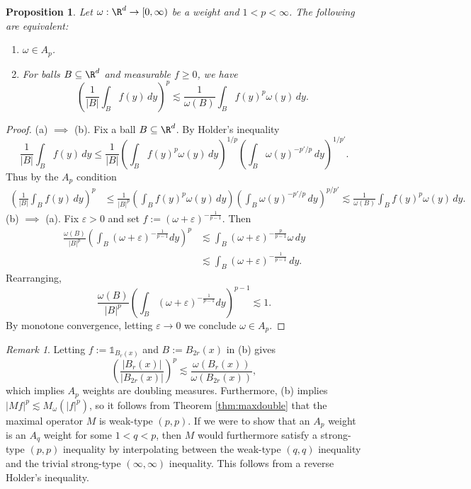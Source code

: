 \documentclass[reqno]{amsart}
\newtheorem{proposition}[theorem]{Proposition}
\theoremstyle{definition}
\theoremstyle{remark}
\newtheorem*{remark}{Remark}
\renewcommand{\epsilon}{\varepsilon}
\begin{document}
\begin{proposition}
	Let $\omega : \R^d \to [0, \infty)$ be a weight and $1 < p < \infty$. The following are equivalent:
	\begin{enumerate}
		\item $\omega \in A_p$.
		\item For balls $B \subseteq \R^d$ and measurable $f \geq 0$, we have
					\[ \left( \frac{1}{|B|} \int_B f(y) \, dy \right)^p \lesssim \frac{1}{\omega(B)} \int_B f(y)^p \omega(y) \, dy. \]
	\end{enumerate}
\end{proposition}

\begin{proof}
	(a) $\implies$ (b). Fix a ball $B \subseteq \R^d$. By Holder's inequality
		\[ \frac{1}{|B|} \int_B f(y) \, dy \leq \frac{1}{|B|} \left( \int_B f(y)^p \omega(y) \, dy\right)^{1/p} \left( \int_B \omega(y)^{-p'/p} \, dy \right)^{1/p'}. \]
	Thus by the $A_p$ condition
		\begin{align*}
			\left(\frac{1}{|B|} \int_B f(y) \, dy\right)^p 
				&\leq \frac{1}{|B|^p} \left( \int_B f(y)^p \omega(y) \, dy\right) \left( \int_B \omega(y)^{-p'/p} \, dy \right)^{p/p'} \lesssim \frac{1}{\omega(B)} \int_B f(y)^p \omega(y) \, dy.
		\end{align*}	
	(b) $\implies$ (a). Fix $\epsilon > 0$ and set $f := (\omega + \epsilon)^{-\frac{1}{p - 1}}$. Then 
		\begin{align*}
			 \frac{\omega(B)}{|B|^p} \left( \int_B  (\omega + \epsilon)^{-\frac{1}{p - 1}} dy\right)^p 
			 		&\lesssim \int_B  (\omega + \epsilon)^{-\frac{p}{p - 1}} \omega \, dy \\
			 		&\lesssim \int_B  (\omega + \epsilon)^{-\frac{1}{p - 1}} \, dy.
		\end{align*}	 
	Rearranging, 
		\[ \frac{\omega(B)}{|B|^p} \left( \int_B (\omega + \epsilon)^{-\frac{1}{p - 1}} dy\right)^{p - 1} \lesssim 1. \]
	By monotone convergence, letting $\epsilon \to 0$ we conclude $\omega \in A_p$. 		
\end{proof}

\begin{remark}
	Letting $f := \mathbb 1_{B_r (x)}$ and $B := B_{2r} (x)$ in (b) gives
		\[ \left( \frac{|B_r (x)|}{|B_{2r}(x)|} \right)^p \lesssim \frac{\omega(B_r(x))}{\omega(B_{2r}(x))},\]
	which implies $A_p$ weights are doubling measures. Furthermore, (b) implies $|Mf|^p \lesssim M_\omega (|f|^p)$, so it follows from Theorem \ref{thm:maxdouble} that the maximal operator $M$ is weak-type $(p, p)$. If we were to show that an $A_p$ weight is an $A_q$ weight for some $1 < q < p$, then $M$ would furthermore satisfy a strong-type $(p, p)$ inequality by interpolating between the weak-type $(q, q)$ inequality and the trivial strong-type $(\infty, \infty)$ inequality. This follows from a reverse Holder's inequality. 
\end{remark}
\end{document}

